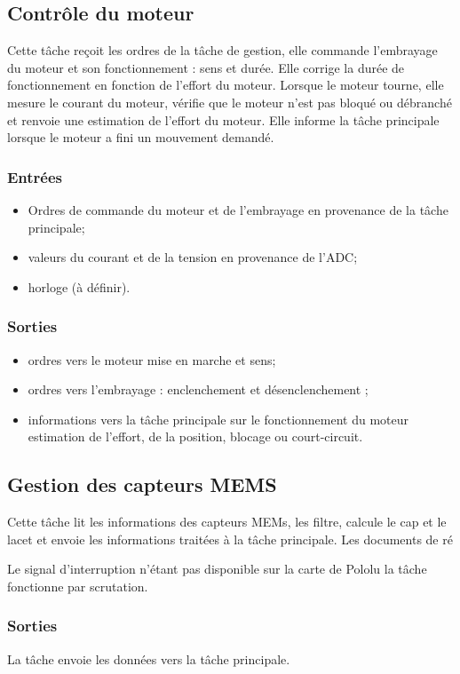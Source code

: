 \documentclass[a4paper,11pt]{report}
\begin{document}
\subsection{Contrôle du moteur}
Cette tâche reçoit les ordres de la tâche de gestion,
elle commande l'embrayage du moteur et son fonctionnement : sens et durée.
Elle corrige la durée de fonctionnement en fonction de l'effort du moteur.
Lorsque le moteur tourne, elle mesure le courant du moteur,
vérifie que le moteur n'est pas bloqué ou débranché et
renvoie une estimation de l'effort du moteur. Elle informe la tâche principale
lorsque le moteur a fini un mouvement demandé.
\subsubsection{Entrées}

\begin{itemize}
  \item Ordres de commande du moteur et de l'embrayage en provenance de la tâche principale;
  \item valeurs du courant et de la tension en provenance de l'ADC;
  \item horloge (à définir).
\end{itemize}
\subsubsection{Sorties}
\begin{itemize}
	\item ordres vers le moteur mise en marche et sens;
	\item ordres vers l'embrayage : enclenchement et désenclenchement ;
	\item informations vers la tâche principale sur le fonctionnement du moteur estimation de l'effort, de la position, blocage ou court-circuit.
\end{itemize}
\subsection{Gestion des capteurs MEMS}
Cette tâche lit les informations des capteurs MEMs, les filtre,
calcule le cap et le lacet et envoie les informations traitées à la tâche principale.
Les documents de ré



Le signal d'interruption n'étant pas disponible sur la carte de Pololu
la tâche fonctionne par scrutation.

\subsubsection{Sorties}
La tâche envoie les données vers la tâche principale.
\end{document}
